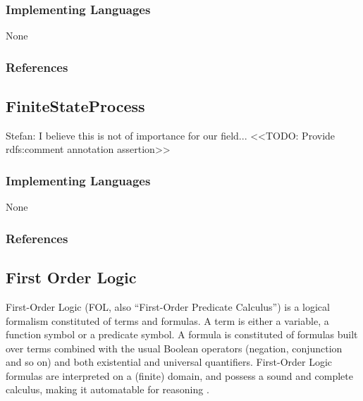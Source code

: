 \subsubsection{Implementing Languages}

None

\subsubsection{References}

\cite{RUIJTERS201529}

\subsection{FiniteStateProcess}
\label{subsecF:FiniteStateProcess}


Stefan: I believe this is not of importance for our field... 
<<TODO: Provide rdfs:comment annotation assertion>>

\subsubsection{Implementing Languages}

None


\subsubsection{References}





\subsection{First Order Logic}
\label{subsecF:FirstOrderLogic}


First-Order Logic (\textsc{FOL}, also ``First-Order Predicate Calculus'') is a logical formalism constituted of terms and formulas. A term is either a variable, a function symbol or a predicate symbol. A formula is constituted of formulas built over terms combined with the usual Boolean operators (negation, conjunction and so on) and both existential and universal quantifiers. First-Order Logic formulas are interpreted on a (finite) domain, and possess a sound and complete calculus, making it automatable for reasoning \cite{B:Kleene:2002}. 

